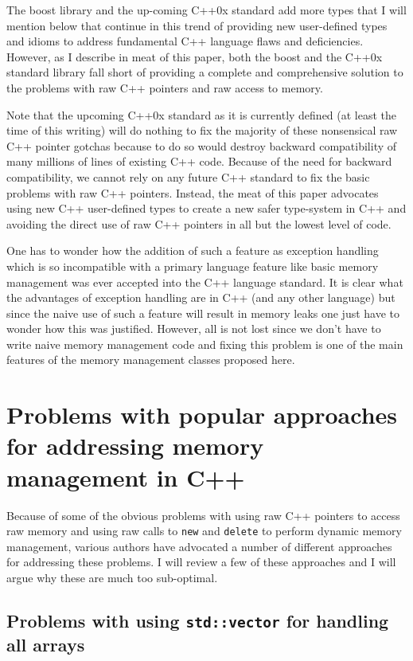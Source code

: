\documentclass[pdf,ps2pdf,11pt]{SANDreport}
\begin{document}
The boost library and the up-coming C++0x standard add more types that
I will mention below that continue in this trend of providing new
user-defined types and idioms to address fundamental C++ language
flaws and deficiencies.  However, as I describe in meat of this paper,
both the boost and the C++0x standard library fall short of providing
a complete and comprehensive solution to the problems with raw C++
pointers and raw access to memory.

Note that the upcoming C++0x standard as it is currently defined (at
least the time of this writing) will do nothing to fix the majority of
these nonsensical raw C++ pointer gotchas because to do so would
destroy backward compatibility of many millions of lines of existing
C++ code.  Because of the need for backward compatibility, we cannot
rely on any future C++ standard to fix the basic problems with raw C++
pointers.  Instead, the meat of this paper advocates using new C++
user-defined types to create a new safer type-system in C++ and
avoiding the direct use of raw C++ pointers in all but the lowest
level of code.

One has to wonder how the addition of such a feature as exception
handling which is so incompatible with a primary language feature like
basic memory management was ever accepted into the C++ language
standard.  It is clear what the advantages of exception handling are
in C++ (and any other language) but since the naive use of such a
feature will result in memory leaks one just have to wonder how this
was justified.  However, all is not lost since we don't have to write
naive memory management code and fixing this problem is one of the
main features of the memory management classes proposed here.


%
{}\section{Problems with popular approaches for addressing memory
management in C++}
\label{sec:current-appraoches-to-mem-mng}
%

Because of some of the obvious problems with using raw C++ pointers to
access raw memory and using raw calls to {}\texttt{new} and
{}\texttt{delete} to perform dynamic memory management, various
authors have advocated a number of different approaches for addressing
these problems.  I will review a few of these approaches and I
will argue why these are much too sub-optimal.


%
{}\subsection{Problems with using {}\texttt{std::vector} for handling
all arrays}
%
\end{document}
